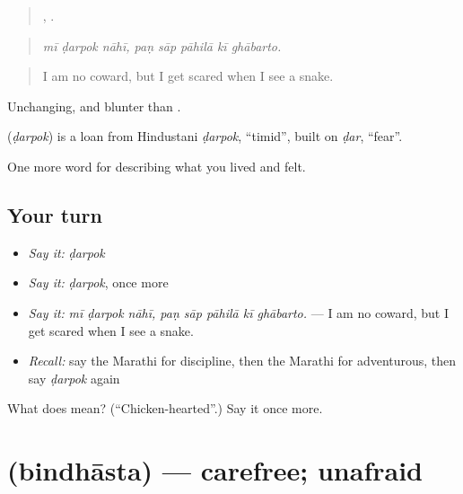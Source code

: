 \begin{quote}
  ,     .
\end{quote}

\begin{quote}
\emph{mī ḍarpok nāhī, paṇ sāp pāhilā kī ghābarto.}
\end{quote}

\begin{quote}
I am no coward, but I get scared when I see a snake.
\end{quote}

Unchanging, and blunter than .

\begin{cousinweb}
\textbf{} (\emph{ḍarpok}) is a loan from Hindustani \emph{ḍarpok}, \textquotedblleft{}timid\textquotedblright{}, built on \emph{ḍar}, \textquotedblleft{}fear\textquotedblright{}.
\end{cousinweb}

\begin{grammarlens}[title={What you've built}]
One more word for describing what you lived and felt.
\end{grammarlens}

\subsection*{Your turn}
\begin{itemize}
\raggedright
  \item \emph{Say it:} \emph{ḍarpok}
  \item \emph{Say it:} \emph{ḍarpok}, once more
  \item \emph{Say it:} \emph{mī ḍarpok nāhī, paṇ sāp pāhilā kī ghābarto.} — I am no coward, but I get scared when I see a snake.
  \item \emph{Recall:} say the Marathi for discipline, then the Marathi for adventurous, then say \emph{ḍarpok} again
\end{itemize}

\begin{tcolorbox}[breakable,colback=teal!4,colframe=teal!35!black,title={Before you move on}]
What does  mean? (\textquotedblleft{}Chicken-hearted\textquotedblright{}.) Say it once more.
\end{tcolorbox}
\section[\texorpdfstring{\mr{बिनधास्त} (bindhāsta)}{बिनधास्त (bindhāsta)}]{ (bindhāsta) — carefree; unafraid}

